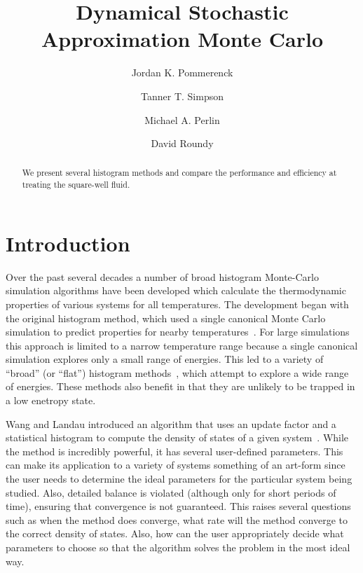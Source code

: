 \documentclass[letterpaper,twocolumn,amsmath,amssymb,pre,aps,10pt]{revtex4-1}
\begin{document}
\title{Dynamical Stochastic Approximation Monte Carlo}

\author{Jordan K. Pommerenck} \author{Tanner T. Simpson}
\author{Michael A. Perlin} \author{David Roundy}

\begin{abstract}
  We present several histogram methods and compare the performance and
  efficiency at treating the square-well fluid.
\end{abstract}

\maketitle

\section{Introduction}
Over the past several decades a number of broad histogram Monte-Carlo
simulation algorithms have been developed which calculate the
thermodynamic properties of various systems for all temperatures.  The
development began with the original histogram method, which used a
single canonical Monte Carlo simulation to predict properties for
nearby temperatures~\cite{ferrenberg1988new}.  For large simulations
this approach is limited to a narrow temperature range because a single
canonical simulation explores only a small range of energies.  This led
to a variety of ``broad'' (or ``flat'') histogram
methods~\cite{penna1996broad, penna1998broad, swendsen1999transition,
wang2001determining, wang2001efficient, trebst2004optimizing}, which
attempt to explore a wide range of energies.  These methods also
benefit in that they are unlikely to be trapped in a low enetropy state.

Wang and Landau introduced an algorithm that uses an update factor and
a statistical histogram to compute the density of states of a given
system~\cite{wang2001determining, wang2001efficient}.  While the method
is incredibly powerful, it has several user-defined parameters.  This
can make its application to a variety of systems something of an
art-form since the user needs to determine the ideal parameters for the
particular system being studied.  Also, detailed balance is violated
(although only for short periods of time), ensuring that convergence is
not guaranteed.  This raises several questions such as when the method
does converge, what rate will the method converge to the correct
density of states. Also, how can the user appropriately decide what
parameters to choose so that the algorithm solves the problem in the
most ideal way.
\end{document}
